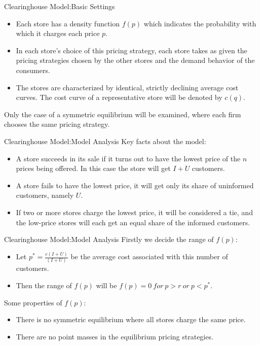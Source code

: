 \documentclass[aspectratio=169]{beamer}  %
\begin{document}
\begin{frame}{Clearinghouse Model:Basic Settings}
    \begin{itemize}
        \item Each store has a density function $f(p)$ which indicates the probability with which it charges each price $p$.
        \item In each store's choice of this pricing strategy, each store takes as given the pricing strategies chosen by the other stores and the demand behavior of the consumers.
        \item The stores are characterized by identical, strictly declining average cost curves. The cost curve of a representative store will be denoted by $c(q)$.
    \end{itemize}
    Only the case of a symmetric equilibrium will be examined, where each firm chooses the same pricing strategy.
\end{frame}

\begin{frame}{Clearinghouse Model:Model Analysis}
    Key facts about the model:
    \begin{itemize}
        \item A store succeeds in its sale if it turns out to have the lowest price of the $n$ prices being offered. In this case the store will get $I+ U$ customers.
        \item A store fails to have the lowest price, it will get only its share of uninformed customers, namely $U$.
        \item If two or more stores charge the lowest price, it will be considered a tie, and the low-price stores will each get an equal share of the informed customers.
    \end{itemize}
\end{frame}


\begin{frame}{Clearinghouse Model:Model Analysis}
    Firstly we decide the range of $f(p)$:
    \begin{itemize}
        \item Let $p^*=\frac{c(I+U)}{(I+U)}$ be the average cost associated with this number of customers.
        \item Then the range of $f(p)$ will be $f(p) = 0 \ for\  p > r \ or\  p <  p^*$.
    \end{itemize}
    Some properties of $f(p)$:
    \begin{itemize}
        \item There is no symmetric equilibrium where all stores charge the same price.
        \item There are no point masses in the equilibrium pricing strategies.
    \end{itemize}
\end{frame}
\end{document}
